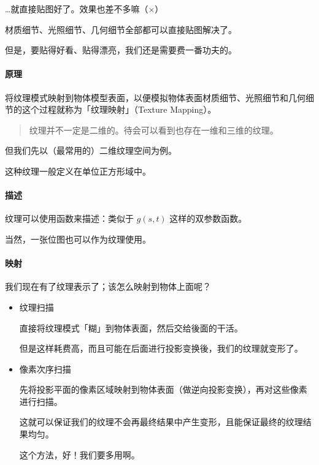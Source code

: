 \documentclass[
]{article}
\begin{document}
\ldots 就直接贴图好了。效果也差不多嘛（×）

材质细节、光照细节、几何细节全部都可以直接贴图解决了。

但是，要贴得好看、贴得漂亮，我们还是需要费一番功夫的。

\hypertarget{header-n46}{%
\paragraph{原理}\label{header-n46}}

将纹理模式映射到物体模型表面，以便模拟物体表面材质细节、光照细节和几何细节的这个过程就称为「纹理映射」（Texture
Mapping）。

\begin{quote}
纹理并不一定是二维的。待会可以看到也存在一维和三维的纹理。
\end{quote}

但我们先以（最常用的）二维纹理空间为例。

这种纹理一般定义在单位正方形域中。

\hypertarget{header-n52}{%
\paragraph{描述}\label{header-n52}}

纹理可以使用函数来描述：类似于 \(g(s, t)\) 这样的双参数函数。

当然，一张位图也可以作为纹理使用。

\hypertarget{header-n55}{%
\paragraph{映射}\label{header-n55}}

我们现在有了纹理表示了；该怎么映射到物体上面呢？

\begin{itemize}
\item
  纹理扫描

  直接将纹理模式「糊」到物体表面，然后交给後面的干活。

  但是这样耗费高，而且可能在后面进行投影变换後，我们的纹理就变形了。
\item
  像素次序扫描

  先将投影平面的像素区域映射到物体表面（做逆向投影变换），再对这些像素进行扫描。

  这就可以保证我们的纹理不会再最终结果中产生变形，且能保证最终的纹理结果均匀。

  这个方法，好！我们要多用啊。
\end{itemize}
\end{document}
